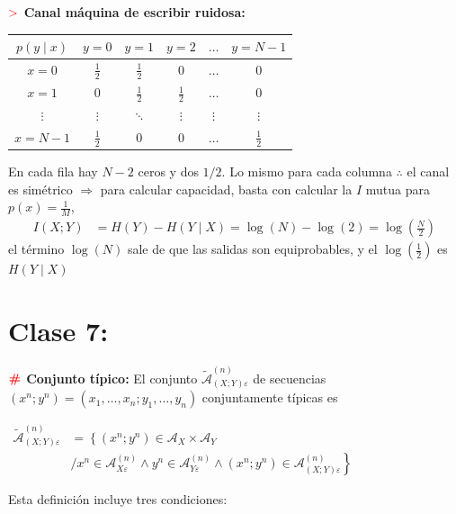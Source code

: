 \documentclass[%
 reprint,
 amsmath,amssymb,
 aps,
]{revtex4-1}
\begin{document}
\textbf{$\textcolor{red}{\mathbf{>}}$ Canal máquina de escribir ruidosa:}

\begin{tabular}{c|ccccc}
  $p(y \mid x)$ & $y=0$ & $y=1$ & $y=2$ & $\ldots$ & $y=N-1$ \\
  \hline$x=0$ & $\frac{1}{2}$ & $\frac{1}{2}$ & 0 & $\ldots$ & 0 \\
  $x=1$ & 0 & $\frac{1}{2}$ & $\frac{1}{2}$ & $\ldots$ & 0 \\
  $\vdots$ & $\vdots$ & $\ddots$ & $\vdots$ & $\vdots$ & $\vdots$ \\
  $x=N-1$ & $\frac{1}{2}$ & 0 & 0 & $\ldots$ & $\frac{1}{2}$
\end{tabular}

En cada fila hay $N-2$ ceros y dos $1 / 2$. Lo mismo para cada columna $\boldsymbol{\therefore}$ el canal es simétrico $\Rightarrow$ para calcular capacidad, basta con calcular la $I$ mutua para $p(x)=\frac{1}{M}$,
$$
\begin{aligned}
I(X ; Y) &=H(Y)-H(Y \mid X) =\log (N)-\log (2) =\log \left(\frac{N}{2}\right)
\end{aligned}
$$
el término $\log (N)$ sale de que las salidas son equiprobables, y el $\log (\frac{1}{2})$ es $H(Y \mid X)$

\section{Clase 7:}

\textbf{$\color{red}{\textbf{\#}}$ Conjunto típico:} 
El conjunto $\tilde{\mathcal{A}}_{(X ; Y) \varepsilon}^{(n)}$ de secuencias $\left(x^{n} ; y^{n}\right)=\left(x_{1}, \ldots, x_{n} ; y_{1}, \ldots, y_{n}\right)$ conjuntamente típicas es

$
\begin{aligned}
  \tilde{\mathcal{A}}_{(X ; Y) \varepsilon}^{(n)} &=
  \left\{  \left(x^{n} ; y^{n}\right) \in \mathcal{A}_{X} \times \mathcal{A}_{Y} \right. \\
          & \left.  /  x^{n} \in \mathcal{A}_{X \varepsilon}^{(n)} \wedge y^{n} \in \mathcal{A}_{Y \varepsilon}^{(n)} \wedge\left(x^{n} ; y^{n}\right) \in \mathcal{A}_{(X ; Y) \varepsilon}^{(n)}\right\} 
\end{aligned}
$

Esta definición incluye tres condiciones:
\end{document}
